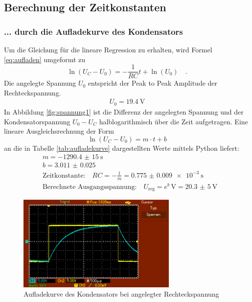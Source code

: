
\subsection{Berechnung der Zeitkonstanten}
\subsubsection{... durch die Aufladekurve des Kondensators}
Um die Gleichung für die lineare Regression zu erhalten, wird Formel \eqref{eq:aufladen} umgeformt zu
\begin{equation}
\ln(U_C - U_0) = -\frac{1}{RC} t + \ln(U_0) \quad .
\end{equation}
Die angelegte Spannung $U_0$ entspricht der Peak to Peak Amplitude der Rechteckspannung.
\begin{align*}
	U_0 = \SI{19.4}{\volt}
\end{align*}
In Abbildung \ref{fig:spannung1} ist die Differenz der angelegten Spannung und der Kondensatorspannung $U_0 - U_C$ halblogarithmisch über die Zeit aufgetragen. Eine lineare Ausgleichsrechnung der Form
\begin{equation}
\ln(U_C - U_0) = m \cdot t + b
\end{equation} an die in Tabelle \ref{tab:aufladekurve} dargestellten Werte mittels Python liefert:
\begin{align}
	&m = \SI{-1290.4(150)}{\second} \\
	&b = \num{3.011(25)} \\
	&\text{Zeitkonstante:} \quad RC = - \frac{1}{m} = \SI{0.775(9)e-3}{\second} \\
	&\text{Berechnete Ausgangsspannung:} \quad U_{\text{reg}} = e ^b \, \si{\volt} = \SI{20,3(5)}{\volt} \label{eq:u_reg}
\end{align}


	
	
	
	
	

\begin{figure}[h!]
	\centering
	\includegraphics[width=0.7\textwidth]{aufladekurve.png}
	\caption{Aufladekurve des Kondensators bei angelegter Rechteckspannung}
	\label{fig:aufladekurve}
\end{figure} 

